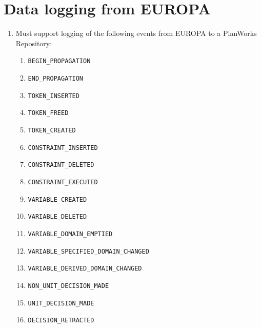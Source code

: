 \documentclass[twoside, 11pt]{article}
\begin{document}
\section{Data logging from EUROPA}
\begin{enumerate}
\item Must support logging of the following events from EUROPA to a PlanWorks Repository:
\begin{enumerate}
\item \begin{verbatim}BEGIN_PROPAGATION\end{verbatim}
\item \begin{verbatim}END_PROPAGATION\end{verbatim}
\item \begin{verbatim}TOKEN_INSERTED\end{verbatim}
\item \begin{verbatim}TOKEN_FREED\end{verbatim}
\item \begin{verbatim}TOKEN_CREATED\end{verbatim}
\item \begin{verbatim}CONSTRAINT_INSERTED\end{verbatim}
\item \begin{verbatim}CONSTRAINT_DELETED\end{verbatim}
\item \begin{verbatim}CONSTRAINT_EXECUTED\end{verbatim}
\item \begin{verbatim}VARIABLE_CREATED\end{verbatim}
\item \begin{verbatim}VARIABLE_DELETED\end{verbatim}
\item \begin{verbatim}VARIABLE_DOMAIN_EMPTIED\end{verbatim}
\item \begin{verbatim}VARIABLE_SPECIFIED_DOMAIN_CHANGED\end{verbatim}
\item \begin{verbatim}VARIABLE_DERIVED_DOMAIN_CHANGED\end{verbatim}
\item \begin{verbatim}NON_UNIT_DECISION_MADE\end{verbatim}
\item \begin{verbatim}UNIT_DECISION_MADE\end{verbatim}
\item \begin{verbatim}DECISION_RETRACTED\end{verbatim}
\end{enumerate}


\end{enumerate}
\end{document}

